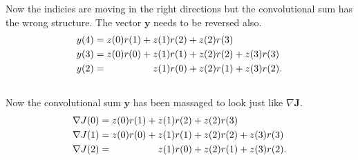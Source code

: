 \clearpage
Now the indicies are moving in the right directions but the convolutional sum has the wrong structure.
The vector $\mathbf{y}$ needs to be reversed also.
\begin{align}
y(4) &= z(0)r(1)				+z(1)r(2) +z(2)r(3)				\\ \nonumber
y(3) &= z(0)r(0)				+z(1)r(1) +z(2)r(2)	+z(3)r(3)	\\ \nonumber
y(2) &= \indent\indent\indent\;  z(1)r(0) +z(2)r(1) +z(3)r(2).	\\ \nonumber
\label{eq:y_reverse}
\end{align}
Now the convolutional sum $\mathbf{y}$ has been massaged to look just like $\nabla \mathbf{J}$.
\begin{align}
\nabla J(0) &= z(0)r(1)				+z(1)r(2) +z(2)r(3)				\\ \nonumber
\nabla J(1) &= z(0)r(0)				+z(1)r(1) +z(2)r(2)	+z(3)r(3)	\\ \nonumber
\nabla J(2) &= \indent\indent\indent\;  z(1)r(0) +z(2)r(1) +z(3)r(2).	\\ \nonumber
\label{eq:toy-delj_repeat}
\end{align}


